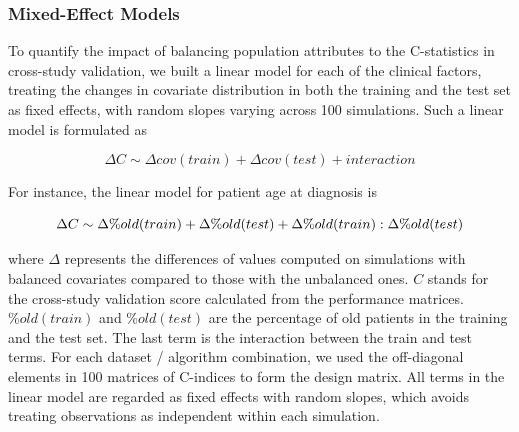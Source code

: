 \documentclass{bioinfo}
\begin{document}
  	\subsubsection{Mixed-Effect Models}
  	To quantify the impact of balancing population attributes to the C-statistics
  	in cross-study validation, we built a linear model for each of the clinical factors, treating the
  	changes in covariate distribution in both the training and the test set 
  	as fixed effects, with random slopes varying across 100 simulations. 
  	Such a linear model is formulated as
  	
  	\begin{equation}\label{linmod}
      \Delta C \sim \Delta cov(train) + \Delta cov(test) + interaction
    \end{equation}
    
    For instance, the linear model for patient age at diagnosis is
  
	
	\begin{equation}
		\footnotesize
		\Delta C \sim \Delta \%old(train) + \Delta \%old(test) + \Delta \%old(train):\Delta \%old(test)
	\end{equation}	
	
	where $\Delta$ represents the differences of values computed on
	simulations with balanced covariates compared to those with the unbalanced ones. $C$ stands for the cross-study validation score 
	calculated from the performance matrices. $\%old(train)$ and $\%old(test)$ are the percentage 
	of old patients in the training and the test set. The last term is the interaction 
	between the train and test terms. For each dataset / algorithm combination, we 
	used the off-diagonal elements in 100 matrices of C-indices to form the design matrix. All terms 
	in the linear model are regarded as fixed effects with random slopes, 
	which avoids treating observations as independent within each simulation. %
	
\end{document}
